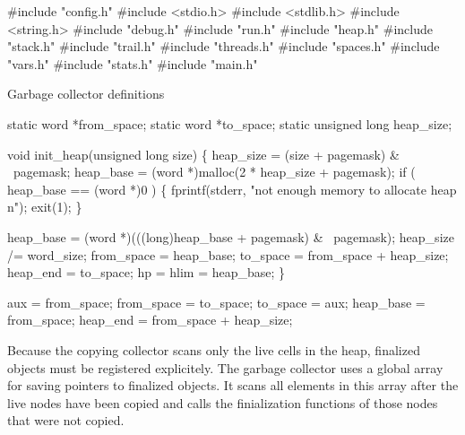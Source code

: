 \nwenddocs{}\endmoddef\nwstartdeflinemarkup{}\nwenddeflinemarkup
#include "config.h"
#include <stdio.h>
#include <stdlib.h>
#include <string.h>
#include "debug.h"
#include "run.h"
#include "heap.h"
#include "stack.h"
#include "trail.h"
#include "threads.h"
#include "spaces.h"
#include "vars.h"
#include "stats.h"
#include "main.h"

\LA{}Garbage collector definitions~{\nwtagstyle{}}\RA{}

static word *from_space;
static word *to_space;
static unsigned long heap_size;

void
init_heap(unsigned long size)
\{
    heap_size = (size + pagemask) & ~pagemask;
    heap_base = (word *)malloc(2 * heap_size + pagemask);
    if ( heap_base == (word *)0 )
    \{
        fprintf(stderr, "not enough memory to allocate heap\\n");
        exit(1);
    \}

    heap_base  = (word *)(((long)heap_base + pagemask) & ~pagemask);
    heap_size /= word_size;
    from_space = heap_base;
    to_space   = from_space + heap_size;
    heap_end   = to_space;
    hp = hlim  = heap_base;
\}

\nwendcode{}\nwdocspar
\nwenddocs{}\endmoddef\nwstartdeflinemarkup{}\nwenddeflinemarkup
aux = from_space; from_space = to_space; to_space = aux;
heap_base = from_space; heap_end = from_space + heap_size;

\nwendcode{}\nwdocspar
Because the copying collector scans only the live cells in the heap,
finalized objects must be registered explicitely. The garbage
collector uses a global array for saving pointers to finalized
objects. It scans all elements in this array after the live nodes
have been copied and calls the finialization functions of those nodes
that were not copied.

